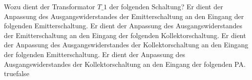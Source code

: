     {Wozu dient der Transformator $T\_1$ der folgenden Schaltung?}
    {Er dient der Anpassung des Ausgangswiderstandes der Emitterschaltung an den Eingang der folgenden Emitterschaltung.}
    {Er dient der Anpassung des Ausgangswiderstandes der Emitterschaltung an den Eingang der folgenden Kollektorschaltung.}
    {Er dient der Anpassung des Ausgangswiderstandes der Kollektorschaltung an den Eingang der folgenden Emitterschaltung.}
    {Er dient der Anpassung des Ausgangswiderstandes der Kollektorschaltung an den Eingang der folgenden PA.}
    {true}{false}